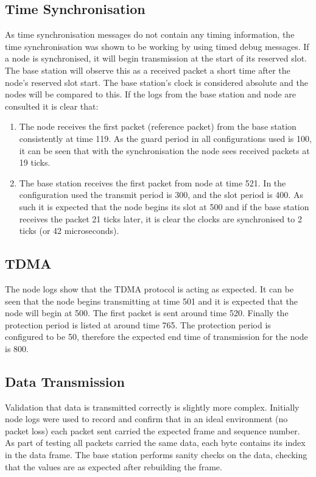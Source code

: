 \documentclass[parskip]{cs4rep}
\begin{document}
\subsection{Time Synchronisation}

As time synchronisation messages do not contain any timing information, the time synchronisation was shown to be working by using timed debug messages. If a node is synchronised, it will begin transmission at the start of its reserved slot. The base station will observe this as a received packet a short time after the node’s reserved slot start. The base station's clock is considered absolute and the nodes will be compared to this. If the logs from the base station and node are consulted it is clear that:

\begin{enumerate}
\item
The node receives the first packet (reference packet) from the base station consistently at time 119. As the guard period in all configurations used is 100, it can be seen that with the synchronisation the node sees received packets at 19 ticks. 
\item
The base station receives the first packet from node at time 521. In the configuration used the transmit period is 300, and the slot period is 400. As such it is expected that the node begins its slot at 500 and if the base station receives the packet 21 ticks later, it is clear the clocks are synchronised to 2 ticks (or 42 microseconds).
\end{enumerate}

\subsection{TDMA}

The node logs show that the TDMA protocol is acting as expected. It can be seen that the node begins transmitting at time 501 and it is expected that the node will begin at 500. The first packet is sent around time 520. Finally the protection period is listed at around time 765. The protection period is configured to be 50, therefore the expected end time of transmission for the node is 800. 

\subsection{Data Transmission}

Validation that data is transmitted correctly is slightly more complex. Initially node logs were used to record and confirm that in an ideal environment (no packet loss) each packet sent carried the expected frame and sequence number. As part of testing all packets carried the same data, each byte contains its index in the data frame. The base station performs sanity checks on the data, checking that the values are as expected after rebuilding the frame. 
\end{document}
